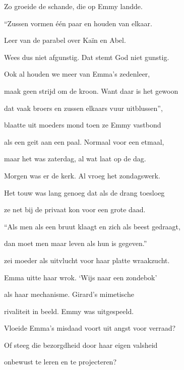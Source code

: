 Zo groeide de schande,
die op Emmy landde.

“Zussen vormen één paar
en houden van elkaar.

Leer van de parabel
over Kaïn en Abel.

Wees dus niet afgunstig.
Dat stemt God niet gunstig.

Ook al houden we meer
van Emma’s zedenleer,

maak geen strijd om de kroon.
Want daar is het gewoon

dat vaak broers en zussen
elkaars vuur uitblussen”,

blaatte uit moeders mond
toen ze Emmy vastbond

als een geit aan een paal.
Normaal voor een etmaal,

maar het was zaterdag,
al wat laat op de dag.

Morgen was er de kerk.
Al vroeg het zondagswerk.

Het touw was lang genoeg
dat als de drang toesloeg

ze net bij de privaat
kon voor een grote daad.

“Als men als een bruut klaagt
en zich als beest gedraagt,

dan moet men maar leven
als hun is gegeven.”

zei moeder als uitvlucht
voor haar platte wraakzucht.

Emma uitte haar wrok.
‘Wijs naar een zondebok’

als haar mechanisme.
Girard’s mimetische

rivaliteit in beeld.
Emmy was uitgespeeld.

Vloeide Emma's misdaad
voort uit angst voor verraad?

Of steeg die bezorgdheid
door haar eigen valsheid

onbewust te leren
en te projecteren?
